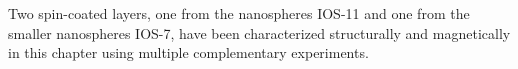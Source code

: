 \documentclass[\main/dresen_thesis.tex]{subfiles}
\begin{document}
  \label{sec:looselyPackedNS:layers:summary}
  Two spin-coated layers, one from the nanospheres IOS-11 and one from the smaller nanospheres IOS-7, have been characterized structurally and magnetically in this chapter using multiple complementary experiments.
  
\end{document}
